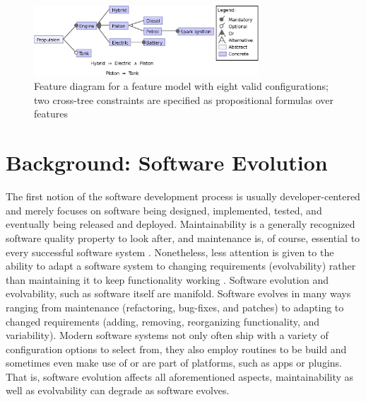 \begin{figure}[htbp]
  \centering
  
  	\includegraphics[width=0.75\textwidth]{images/introduction_fm.eps}
  \caption{Feature diagram for a feature model with eight valid configurations;
  two cross-tree constraints are specified as propositional formulas over
  features}
  \label{fig:introduction_fm}
\end{figure}

\section{Background: Software Evolution} \label{sec:evolving_solftware}
The first notion of the software development process is usually
developer-centered and merely focuses on software being designed, implemented,
tested, and eventually being released and deployed.
Maintainability is a generally recognized software quality
property to look after, and maintenance is, of course, essential to every
successful software system \cite{liggesmeyer_software-qualitat:_2009}. Nonetheless, less attention is given to
the ability to adapt a software system to changing requirements (evolvability) rather than maintaining it to keep functionality
working \citep{parnas_software_1994}. Software evolution and evolvability, such
as software itself are manifold. Software evolves in many ways ranging from
maintenance (refactoring, bug-fixes, and patches) to adapting to changed
requirements (adding, removing, reorganizing functionality, and variability).
Modern software systems not only often ship with a variety of configuration
options to select from, they also employ routines to be build and sometimes even
make use of or are part of platforms, such as apps or plugins. That is,
software evolution affects all aforementioned aspects, maintainability as
well as evolvability can degrade as software evolves.


